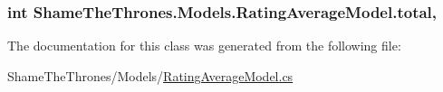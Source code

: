 \subsubsection[{\texorpdfstring{total}{total}}]{\setlength{\rightskip}{0pt plus 5cm}int Shame\+The\+Thrones.\+Models.\+Rating\+Average\+Model.\+total\hspace{0.3cm}{\ttfamily [get]}, {\ttfamily [set]}}\hypertarget{class_shame_the_thrones_1_1_models_1_1_rating_average_model_ac6c3c1cc691f6cb5d0362a598e78a426}{}\label{class_shame_the_thrones_1_1_models_1_1_rating_average_model_ac6c3c1cc691f6cb5d0362a598e78a426}


The documentation for this class was generated from the following file\+:\begin{DoxyCompactItemize}
\item 
Shame\+The\+Thrones/\+Models/\hyperlink{_rating_average_model_8cs}{Rating\+Average\+Model.\+cs}\end{DoxyCompactItemize}

